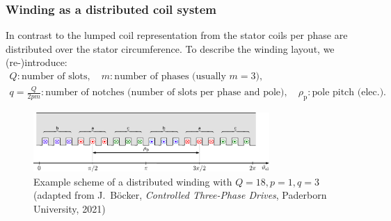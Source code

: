 \begin{frame}
	\frametitle{Winding as a distributed coil system}
    In contrast to the lumped coil representation from  the stator coils per phase are distributed over the stator circumference. To describe the winding layout, we (re-)introduce:
    \begin{gather*}
		Q: \mbox{number of slots}, \quad m: \mbox{number of phases (usually $m=3$)}, \\ q=\frac{Q}{2 p m}: \mbox{number of notches  (number of slots per phase and pole)}, \quad \rho_\mathrm{p}: \mbox{pole pitch (elec.).}
	\end{gather*}
    \begin{figure}
        \centering
        \includegraphics[width=0.8\textwidth]{fig/lec05/Scheme_distributed_winding.pdf}
        \caption{Example scheme of a distributed winding with $Q=18, p = 1, q=3$ (adapted from J.~B\"ocker, \textit{Controlled Three-Phase Drives}, Paderborn University, 2021)}
        \label{fig:Scheme_distributed_winding}
    \end{figure}
\end{frame}

